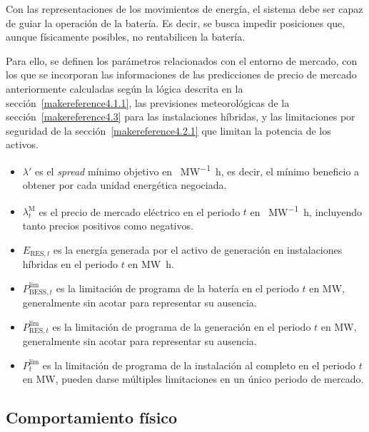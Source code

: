 Con las representaciones de los movimientos de energía, el sistema debe ser capaz de guiar la operación de la batería. Es decir, se busca impedir posiciones que, aunque físicamente posibles, no rentabilicen la batería.

Para ello, se definen los parámetros relacionados con el entorno de mercado, con los que se incorporan las informaciones de las predicciones de precio de mercado anteriormente calculadas según la lógica descrita en la sección~\ref{makereference4.1.1}, las previsiones meteorológicas de la sección~\ref{makereference4.3} para las instalaciones híbridas, y las limitaciones por seguridad de la sección~\ref{makereference4.2.1} que limitan la potencia de los activos.

\begin{itemize}

  \item \( \lambda' \) es el \textit{spread} mínimo objetivo en \si{\text{\euro}\per\mega\watt\hour}, es decir, el mínimo beneficio a obtener por cada unidad energética negociada.

  \item \( \lambda^{\mathrm{M}}_{t} \) es el precio de mercado eléctrico en el periodo \( t \) en \si{\text{\euro}\per\mega\watt\hour}, incluyendo tanto precios positivos como negativos.

  \item \( E_{\mathrm{RES}, t} \) es la energía generada por el activo de generación en instalaciones híbridas en el periodo \( t \) en \si{{\mega\watt\hour}}.

  \item \( P^{\text{lim}}_{\mathrm{BESS}, t} \) es la limitación de programa de la batería en el periodo \( t \) en \si{\mega\watt}, generalmente sin acotar para representar su ausencia.

  \item \( P^{\text{lim}}_{\mathrm{RES}, t} \) es la limitación de programa de la generación en el periodo \( t \) en \si{\mega\watt}, generalmente sin acotar para representar su ausencia.

  \item \( P^{\text{lim}}_{t} \) es la limitación de programa de la instalación al completo en el periodo \( t \) en \si{\mega\watt}, pueden darse múltiples limitaciones en un único periodo de mercado.

\end{itemize}

\subsection{Comportamiento físico}%
\label{makereference5.1.5}


